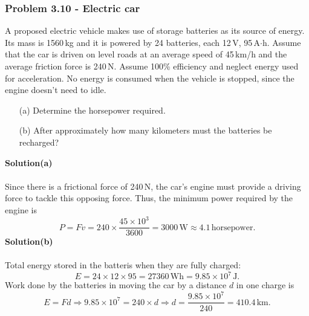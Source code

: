 \documentclass{article}
\begin{document}
\subsubsection*{Problem 3.10 - Electric car}
A proposed electric vehicle makes use of storage batteries as its source of energy. Its mass is 1560\,kg and it is powered by 24 batteries, each 12\,V, 95\,A$\cdot$h. Assume that the car is driven on level roads at an average speed of 45\,km/h and the average friction force is 240\,N. Assume 100\% efficiency and neglect energy used for acceleration. No energy is consumed when the vehicle is stopped, since the engine doesn’t need to idle.
\begin{enumerate}
    \item[(a)]Determine the horsepower required.
    \item[(b)]After approximately how many kilometers must the batteries be recharged?
\end{enumerate}
\textbf{Solution(a)}
\\
\\Since there is a frictional force of 240\,N, the car's engine must provide a driving force to tackle this opposing force. Thus, the minimum power required by the engine is
\[P=Fv=240\times\frac{45\times10^3}{3600}=3000\,\text{W}\approx4.1\,\text{horsepower}.\]
\textbf{Solution(b)}
\\
\\Total energy stored in the batteris when they are fully charged:
\[E=24\times12\times95=27360\,\text{Wh}=9.85\times10^7\,\text{J}.\]
Work done by the batteries in moving the car by a distance $d$ in one charge is
\[E=Fd\Rightarrow9.85\times10^7=240\times d\Rightarrow d=\frac{9.85\times10^7}{240}=410.4\,\text{km}.\]
\end{document}
